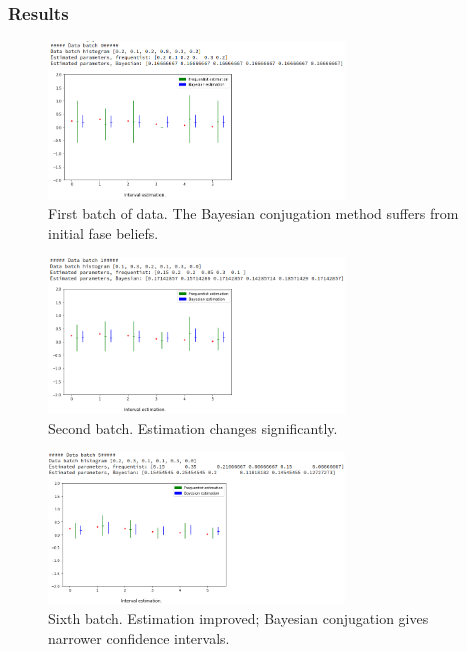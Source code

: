 \documentclass[12pt]{article}
\theoremstyle{definition}
\begin{document}
\subsubsection{Results}

\begin{figure}[H]
  \centering
  \includegraphics[width=0.7\textwidth,keepaspectratio]{figures/ex1_1.png}
  \caption{First batch of data. The Bayesian conjugation method suffers from
    initial fase beliefs.}
\end{figure}

\begin{figure}[H]
  \centering
  \includegraphics[width=0.7\textwidth,keepaspectratio]{figures/ex1_2.png}
  \caption{Second batch. Estimation changes significantly.}
\end{figure}

\begin{figure}[H]
  \centering
  \includegraphics[width=0.7\textwidth,keepaspectratio]{figures/ex1_3.png}
  \caption{Sixth batch. Estimation improved; Bayesian conjugation gives narrower
  confidence intervals.}
\end{figure}
\end{document}
